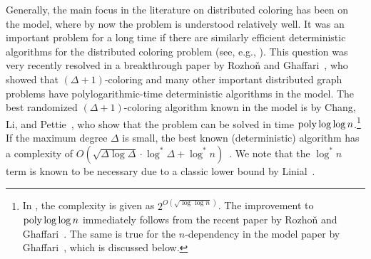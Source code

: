 Generally, the main focus in the literature on distributed coloring has been on the \LOCAL model, where by now the problem is understood relatively well. It was an important problem for a long time if there are similarly efficient deterministic algorithms for the distributed coloring problem (see, e.g., \cite{linial92,barenboimelkin_book,stoc17_complexity,derandomization_FOCS18}). This question was very recently resolved in a breakthrough paper by Rozho\v{n} and Ghaffari~\cite{RG19}, who showed that $(\Delta+1)$-coloring and many other important distributed graph problems have polylogarithmic-time deterministic algorithms in the \LOCAL model. The best randomized $(\Delta+1)$-coloring algorithm known %
in the \LOCAL model is by Chang, Li, and Pettie~\cite{chang18_coloring}, who show that the problem can be solved in time $\operatorname{poly}\log\log n$.\footnote{In \cite{chang18_coloring}, the complexity is given as $2^{O(\sqrt{\log\log n})}$. The improvement to $\operatorname{poly}\log\log n$ immediately follows from the recent paper by Rozho\v{n} and Ghaffari~\cite{RG19}. The same is true for the $n$-dependency in the \CONGEST model paper by Ghaffari~\cite{ghaffari19}, which is discussed below.} If the maximum degree $\Delta$ is small, the best known (deterministic) algorithm has a complexity of $O(\sqrt{\Delta\log\Delta}\cdot\log^*\Delta + \log^* n)$~\cite{fraigniaud16,BEG18}. We note that the $\log^* n$ term is known to be necessary due to a classic lower bound by Linial~\cite{linial92}. 

